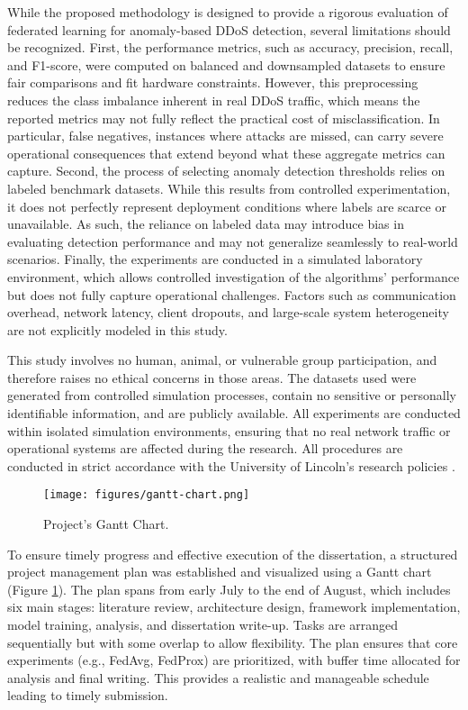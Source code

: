 While the proposed methodology is designed to provide a rigorous evaluation of federated learning for anomaly-based DDoS detection, several limitations should be recognized. First, the performance metrics, such as accuracy, precision, recall, and F1-score, were computed on balanced and downsampled datasets to ensure fair comparisons and fit hardware constraints. However, this preprocessing reduces the class imbalance inherent in real DDoS traffic, which means the reported metrics may not fully reflect the practical cost of misclassification. In particular, false negatives, instances where attacks are missed, can carry severe operational consequences that extend beyond what these aggregate metrics can capture. Second, the process of selecting anomaly detection thresholds relies on labeled benchmark datasets. While this results from controlled experimentation, it does not perfectly represent deployment conditions where labels are scarce or unavailable. As such, the reliance on labeled data may introduce bias in evaluating detection performance and may not generalize seamlessly to real-world scenarios. Finally, the experiments are conducted in a simulated laboratory environment, which allows controlled investigation of the algorithms' performance but does not fully capture operational challenges. Factors such as communication overhead, network latency, client dropouts, and large-scale system heterogeneity are not explicitly modeled in this study.

This study involves no human, animal, or vulnerable group participation, and therefore raises no ethical concerns in those areas. The datasets used were generated from controlled simulation processes, contain no sensitive or personally identifiable information, and are publicly available. All experiments are conducted within isolated simulation environments, ensuring that no real network traffic or operational systems are affected during the research. All procedures are conducted in strict accordance with the University of Lincoln’s research policies \citep{uol-research-policies}. 

\begin{figure}[h]
    \centering
    \texttt{[image: figures/gantt-chart.png]}
    \caption{Project's Gantt Chart.}
    \label{fig:gantt_chart}
\end{figure}

To ensure timely progress and effective execution of the dissertation, a structured project management plan was established and visualized using a Gantt chart (Figure \ref{fig:gantt_chart}). The plan spans from early July to the end of August, which includes six main stages: literature review, architecture design, framework implementation, model training, analysis, and dissertation write-up. Tasks are arranged sequentially but with some overlap to allow flexibility. The plan ensures that core experiments (e.g., FedAvg, FedProx) are prioritized, with buffer time allocated for analysis and final writing. This provides a realistic and manageable schedule leading to timely submission.

